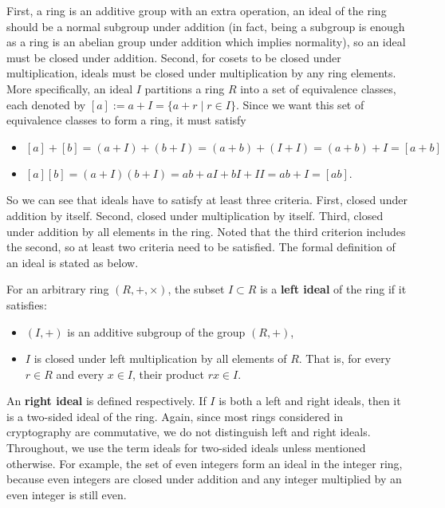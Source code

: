 \documentclass[../main.tex]{subfiles}
\begin{document}
First, a ring is an additive group with an extra operation, an ideal of the ring should be a normal subgroup under addition (in fact, being a subgroup is enough as a ring is an abelian group under addition which implies normality), so an ideal must be closed under addition. Second, for cosets to be closed under multiplication, ideals must be closed under multiplication by any ring elements. 
More specifically, an ideal $I$ partitions a ring $R$ into a set of equivalence classes, each denoted by $[a] := a + I = \{a + r \mid r \in I\}$. Since we want this set of equivalence classes to form a ring, it must satisfy
\begin{itemize}
    \item $[a]+[b] = (a + I)+(b+I)=(a+b)+(I+I) = (a+b)+ I = [a+b]$ 
    \item $[a] [b] = (a+I)(b+I) = ab + aI + bI + I I = ab + I = [ab]$.
\end{itemize}
So we can see that ideals have to satisfy at least three criteria. First, closed under addition by itself. Second, closed under multiplication by itself. Third, closed under addition by all elements in the ring. Noted that the third criterion includes the second, so at least two criteria need to be satisfied. 
The formal definition of an ideal is stated as below. 

\begin{definition}
For an arbitrary ring $(R, +, \times)$, the subset $I \subset R$ is a \textbf{left ideal} of the ring if it satisfies: 
\begin{itemize}
    \item $(I, +)$ is an additive subgroup of the group $(R, +)$, 
    \item $I$ is closed under left multiplication by all elements of $R$. That is, for every $r \in R$ and every $x \in I$, their product $rx \in I$. 
\end{itemize}
\end{definition}
An \textbf{right ideal} is defined respectively. If $I$ is both a left and right ideals, then it is a two-sided ideal of the ring. Again, since most rings considered in cryptography are commutative, we do not distinguish left and right ideals. Throughout, we use the term ideals for two-sided ideals unless mentioned otherwise. 
For example, the set of even integers form an ideal in the integer ring, because even integers are closed under addition and any integer multiplied by an even integer is still even.  
\end{document}
